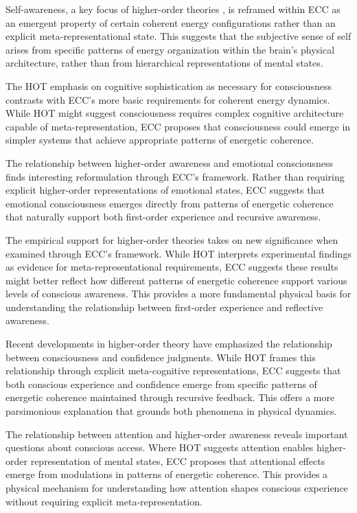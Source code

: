 \begin{refsection}
Self-awareness, a key focus of higher-order theories \cite{Kriegel2009}, is reframed within ECC as an emergent property of certain coherent energy configurations rather than an explicit meta-representational state. This suggests that the subjective sense of self arises from specific patterns of energy organization within the brain's physical architecture, rather than from hierarchical representations of mental states.

The HOT emphasis on cognitive sophistication as necessary for consciousness \cite{Brown2019} contrasts with ECC's more basic requirements for coherent energy dynamics. While HOT might suggest consciousness requires complex cognitive architecture capable of meta-representation, ECC proposes that consciousness could emerge in simpler systems that achieve appropriate patterns of energetic coherence.

The relationship between higher-order awareness and emotional consciousness \cite{LeDoux2017} finds interesting reformulation through ECC's framework. Rather than requiring explicit higher-order representations of emotional states, ECC suggests that emotional consciousness emerges directly from patterns of energetic coherence that naturally support both first-order experience and recursive awareness.

The empirical support for higher-order theories \cite{Lau2011} takes on new significance when examined through ECC's framework. While HOT interprets experimental findings as evidence for meta-representational requirements, ECC suggests these results might better reflect how different patterns of energetic coherence support various levels of conscious awareness. This provides a more fundamental physical basis for understanding the relationship between first-order experience and reflective awareness.

Recent developments in higher-order theory \cite{Brown2019} have emphasized the relationship between consciousness and confidence judgments. While HOT frames this relationship through explicit meta-cognitive representations, ECC suggests that both conscious experience and confidence emerge from specific patterns of energetic coherence maintained through recursive feedback. This offers a more parsimonious explanation that grounds both phenomena in physical dynamics.

The relationship between attention and higher-order awareness \cite{Rosenthal2019} reveals important questions about conscious access. Where HOT suggests attention enables higher-order representation of mental states, ECC proposes that attentional effects emerge from modulations in patterns of energetic coherence. This provides a physical mechanism for understanding how attention shapes conscious experience without requiring explicit meta-representation.


\end{refsection}
